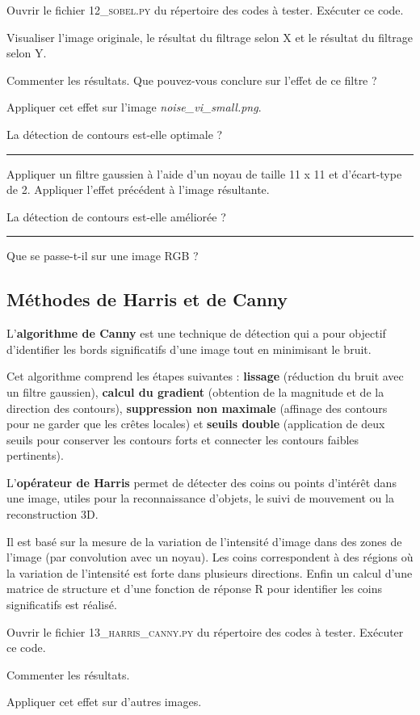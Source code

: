 \medskip

\Manip Ouvrir le fichier \textsc{12\_sobel.py} du répertoire des codes à tester. Exécuter ce code.

\Manip Visualiser l'image originale, le résultat du filtrage selon X et le résultat du filtrage selon Y.

\Quest Commenter les résultats. Que pouvez-vous conclure sur l'effet de ce filtre ?

\Manip Appliquer cet effet sur l'image \textsl{noise\_vi\_small.png}.

\Quest La détection de contours est-elle optimale ?

\noindent \rule{\linewidth}{1pt}

\Manip Appliquer un filtre gaussien à l'aide d'un noyau de taille 11 x 11 et d'écart-type de 2. Appliquer l'effet précédent à l'image résultante.

\Quest La détection de contours est-elle améliorée ?

\noindent \rule{\linewidth}{1pt}

\Quest Que se passe-t-il sur une image RGB ? 

\subsection{Méthodes de Harris et de Canny}

L'\textbf{algorithme de Canny} est une technique de détection qui a pour objectif d'identifier les bords significatifs d'une image tout en minimisant le bruit.

Cet algorithme comprend les étapes suivantes : \textbf{lissage} (réduction du bruit avec un filtre gaussien), \textbf{calcul du gradient} (obtention de la magnitude et de la direction des contours), \textbf{suppression non maximale} (affinage des contours pour ne garder que les crêtes locales) et \textbf{seuils double} (application de deux seuils pour conserver les contours forts et connecter les contours faibles pertinents).

\medskip

L'\textbf{opérateur de Harris} permet de détecter des coins ou points d'intérêt dans une image, utiles pour la reconnaissance d'objets, le suivi de mouvement ou la reconstruction 3D.

Il est basé sur la mesure de la variation de l'intensité d'image dans des zones de l'image (par convolution avec un noyau). Les coins correspondent à des régions où la variation de l'intensité est forte dans plusieurs directions. Enfin un calcul d'une matrice de structure et d'une fonction de réponse R pour identifier les coins significatifs est réalisé.

\medskip

\Manip Ouvrir le fichier \textsc{13\_harris\_canny.py} du répertoire des codes à tester. Exécuter ce code.

\Quest Commenter les résultats. 

\Manip Appliquer cet effet sur d'autres images.



